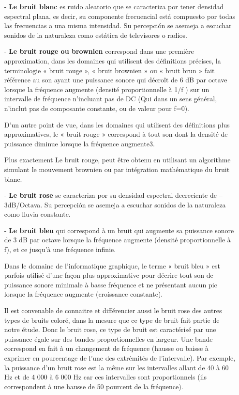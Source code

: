 \documentclass[conference,onecolumn]{IEEEtran}
\begin{document}
\begin{itemize} %

    \item[-] \textbf{Le bruit blanc} es ruido aleatorio que se caracteriza por tener densidad espectral plana, es decir, su componente frecuencial está compuesto por todas las frecuencias a una misma intensidad. Su percepción se asemeja a escuchar sonidos de la naturaleza como estática de televisores o radios.
    

    \item[-] \textbf{Le bruit rouge ou brownien} correspond dans une première approximation, dans les domaines qui utilisent des définitions précises, la terminologie « bruit rouge », « bruit brownien » ou « bruit brun » fait référence au son ayant une puissance sonore qui décroît de 6 dB par octave lorsque la fréquence augmente (densité proportionnelle à 1/f ) sur un intervalle de fréquence n'incluant pas de DC (Qui dans un sens général, n'inclut pas de composante constante, ou de valeur pour f=0). 


    D’un autre point de vue, dans les domaines qui utilisent des définitions plus approximatives, le « bruit rouge » correspond à tout son dont la densité de puissance diminue lorsque la fréquence augmente3. 

    Plus exactement Le bruit rouge, peut être obtenu en utilisant un algorithme simulant le mouvement brownien ou par intégration mathématique du bruit blanc.
    
    \item[-] \textbf{Le bruit rose} se caracteriza por su densidad espectral decreciente de –3dB/Octava. Su percepción se asemeja a escuchar sonidos de la naturaleza como lluvia constante.
    

    \item[-] \textbf{Le bruit bleu} qui correspond à un bruit qui augmente sa puissance sonore de 3 dB par octave lorsque la fréquence augmente (densité proportionnelle à f), et ce jusqu’à une fréquence infinie. 

    Dans le domaine de l’informatique graphique, le terme « bruit bleu » est parfois utilisé d’une façon plus approximative pour décrire tout son de puissance sonore minimale à basse fréquence et ne présentant aucun pic lorsque la fréquence augmente (croissance constante). 

    Il est convenable de connaitre et différencier aussi le bruit rose des autres types de bruits coloré, dans la mesure que ce type de bruit fait partie de notre étude. Donc le bruit rose, ce type de bruit est caractérisé par une puissance égale sur des bandes proportionnelles en largeur. Une bande correspond en fait à un changement de fréquence (hausse ou baisse à exprimer en pourcentage de l’une des extrémités de l’intervalle). Par exemple, la puissance d’un bruit rose est la même sur les intervalles allant de 40 à 60 Hz et de 4 000 à 6 000 Hz car ces intervalles sont proportionnels (ils correspondent à une hausse de 50 pourcent de la fréquence). 

\end{itemize}
\end{document}
